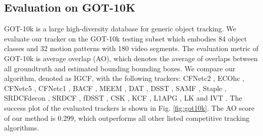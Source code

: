 \documentclass[review]{elsarticle}
\begin{document}
\subsection{Evaluation on GOT-10K}
GOT-10k \cite{Huang2018GOT10kAL} is a large high-diversity database for generic object tracking. We evaluate our tracker on the GOT-10k testing subset which embodies 84 object classes and 32 motion patterns with 180 video segments. The evaluation metric of GOT-10k is average overlap (AO), which  denotes the average of overlaps between all groundtruth and estimated bounding bounding boxes. We compare our algorithm, denoted as IGCF, with the following trackers: CFNetc2 \cite{Valmadre2017EndtoEndRL}, ECOhc \cite{Danelljan2017ECOEC}, CFNetc5 \cite{Valmadre2017EndtoEndRL}, CFNetc1 \cite{Valmadre2017EndtoEndRL}, BACF \cite{Galoogahi2017LearningBC}, MEEM \cite{Zhang2014MEEMRT}, DAT \cite{Possegger2015InDO}, DSST \cite{Danelljan2014AccurateSE}, SAMF \cite{Li2014ASA}, Staple \cite{Bertinetto2016StapleC}, SRDCFdecon \cite{Danelljan2016AdaptiveDO}, SRDCF \cite{Danelljan2015LearningSR}, fDSST \cite{Danelljan2017DiscriminativeSS}, CSK \cite{Henriques2012ExploitingTC}, KCF \cite{Henriques2015HighSpeedTW}, L1APG \cite{Bao2012RealTR}, LK \cite{Shi1994GoodFT} and IVT \cite{Ross2007IncrementalLF}. The success plot of the evaluated trackers is shown in Fig. \ref{fig:got10k}.  The AO score of our method is 0.299, which outperforms all other listed competitive tracking algorithms. 
\end{document}
